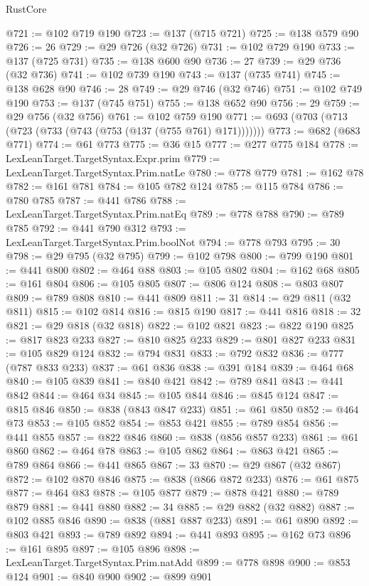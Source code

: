 \begin{lexlean}{RustCore}
\begin{coremodule}
@721 := @102 @719 @190
@723 := @137 (@715 @721)
@725 := @138 @579 @90
@726 := 26
@729 := @29 @726 (@32 @726)
@731 := @102 @729 @190
@733 := @137 (@725 @731)
@735 := @138 @600 @90
@736 := 27
@739 := @29 @736 (@32 @736)
@741 := @102 @739 @190
@743 := @137 (@735 @741)
@745 := @138 @628 @90
@746 := 28
@749 := @29 @746 (@32 @746)
@751 := @102 @749 @190
@753 := @137 (@745 @751)
@755 := @138 @652 @90
@756 := 29
@759 := @29 @756 (@32 @756)
@761 := @102 @759 @190
@771 := @693 (@703 (@713 (@723 (@733 (@743 (@753 (@137 (@755 @761) @171)))))))
@773 := @682 (@683 @771)
@774 := @61 @773
@775 := @36 @15
@777 := @277 @775 @184
@778 := LexLeanTarget.TargetSyntax.Expr.prim
@779 := LexLeanTarget.TargetSyntax.Prim.natLe
@780 := @778 @779
@781 := @162 @78
@782 := @161 @781
@784 := @105 @782 @124
@785 := @115 @784
@786 := @780 @785
@787 := @441 @786
@788 := LexLeanTarget.TargetSyntax.Prim.natEq
@789 := @778 @788
@790 := @789 @785
@792 := @441 @790 @312
@793 := LexLeanTarget.TargetSyntax.Prim.boolNot
@794 := @778 @793
@795 := 30
@798 := @29 @795 (@32 @795)
@799 := @102 @798
@800 := @799 @190
@801 := @441 @800
@802 := @464 @88
@803 := @105 @802
@804 := @162 @68
@805 := @161 @804
@806 := @105 @805
@807 := @806 @124
@808 := @803 @807
@809 := @789 @808
@810 := @441 @809
@811 := 31
@814 := @29 @811 (@32 @811)
@815 := @102 @814
@816 := @815 @190
@817 := @441 @816
@818 := 32
@821 := @29 @818 (@32 @818)
@822 := @102 @821
@823 := @822 @190
@825 := @817 @823 @233
@827 := @810 @825 @233
@829 := @801 @827 @233
@831 := @105 @829 @124
@832 := @794 @831
@833 := @792 @832
@836 := @777 (@787 @833 @233)
@837 := @61 @836
@838 := @391 @184
@839 := @464 @68
@840 := @105 @839
@841 := @840 @421
@842 := @789 @841
@843 := @441 @842
@844 := @464 @34
@845 := @105 @844
@846 := @845 @124
@847 := @815 @846
@850 := @838 (@843 @847 @233)
@851 := @61 @850
@852 := @464 @73
@853 := @105 @852
@854 := @853 @421
@855 := @789 @854
@856 := @441 @855
@857 := @822 @846
@860 := @838 (@856 @857 @233)
@861 := @61 @860
@862 := @464 @78
@863 := @105 @862
@864 := @863 @421
@865 := @789 @864
@866 := @441 @865
@867 := 33
@870 := @29 @867 (@32 @867)
@872 := @102 @870 @846
@875 := @838 (@866 @872 @233)
@876 := @61 @875
@877 := @464 @83
@878 := @105 @877
@879 := @878 @421
@880 := @789 @879
@881 := @441 @880
@882 := 34
@885 := @29 @882 (@32 @882)
@887 := @102 @885 @846
@890 := @838 (@881 @887 @233)
@891 := @61 @890
@892 := @803 @421
@893 := @789 @892
@894 := @441 @893
@895 := @162 @73
@896 := @161 @895
@897 := @105 @896
@898 := LexLeanTarget.TargetSyntax.Prim.natAdd
@899 := @778 @898
@900 := @853 @124
@901 := @840 @900
@902 := @899 @901

\end{coremodule}
\end{lexlean}
